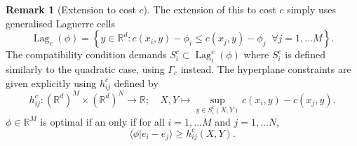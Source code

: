 \documentclass[11pt, oneside, titlepage]{book}
\theoremstyle{plain}
\theoremstyle{definition}
\newtheorem{remark}[theorem]{Remark}
\newcommand{\R}{\mathbb{R}}
\DeclareMathOperator{\lag}{Lag}
\begin{document}
\begin{remark}[Extension to cost $c$]
The extension of this to cost $c$ simply uses generalised Laguerre cells
\begin{equation*}
    \lag_{c}(\phi) = \left\{ y \in \R^d : c(x_i, y) - \phi_i \leq c(x_j, y) - \phi_j\;\; \forall j= 1,...M\right\}.
\end{equation*}
The compatibility condition demands $S_i^c \subset \lag_i^c(\phi)$ where $S_i^c$ is defined similarly to the quadratic case, using $\Gamma_c$ instead. The hyperplane constraints are given explicitly using $h_{ij}^c$ defined by
\begin{equation*}
    h_{ij}^c : (\R^d)^M \times (\R^d)^N \to \R; \quad X, Y \mapsto \sup_{y \in S_i^c(X,Y)} c(x_i, y) -c(x_j, y).
\end{equation*}
$\phi \in \R^M$ is optimal if an only if for all $i = 1,...M$ and $j=1,...N$,
\begin{equation*}
    \langle \phi | e_i - e_j \rangle \geq h_{ij}^c(X, Y).
\end{equation*}
\end{remark}
\end{document}
